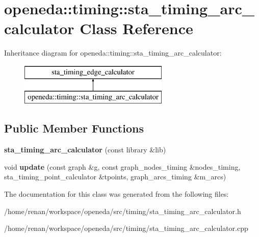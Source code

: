 \hypertarget{classopeneda_1_1timing_1_1sta__timing__arc__calculator}{\section{openeda\-:\-:timing\-:\-:sta\-\_\-timing\-\_\-arc\-\_\-calculator Class Reference}
\label{classopeneda_1_1timing_1_1sta__timing__arc__calculator}
}
Inheritance diagram for openeda\-:\-:timing\-:\-:sta\-\_\-timing\-\_\-arc\-\_\-calculator\-:\begin{figure}[H]
\begin{center}
\leavevmode
\includegraphics[height=2.000000cm]{classopeneda_1_1timing_1_1sta__timing__arc__calculator}
\end{center}
\end{figure}
\subsection*{Public Member Functions}
\begin{DoxyCompactItemize}
\item 
\hypertarget{classopeneda_1_1timing_1_1sta__timing__arc__calculator_a478550315b8d1971a99b67e966619e0b}{{\bfseries sta\-\_\-timing\-\_\-arc\-\_\-calculator} (const library \&lib)}\label{classopeneda_1_1timing_1_1sta__timing__arc__calculator_a478550315b8d1971a99b67e966619e0b}

\item 
\hypertarget{classopeneda_1_1timing_1_1sta__timing__arc__calculator_acd5f6f3ff6936ec48aee3a61d12312cf}{void {\bfseries update} (const graph \&g, const graph\-\_\-nodes\-\_\-timing \&nodes\-\_\-timing, sta\-\_\-timing\-\_\-point\-\_\-calculator \&tpoints, graph\-\_\-arcs\-\_\-timing \&m\-\_\-arcs)}\label{classopeneda_1_1timing_1_1sta__timing__arc__calculator_acd5f6f3ff6936ec48aee3a61d12312cf}

\end{DoxyCompactItemize}


The documentation for this class was generated from the following files\-:\begin{DoxyCompactItemize}
\item 
/home/renan/workspace/openeda/src/timing/sta\-\_\-timing\-\_\-arc\-\_\-calculator.\-h\item 
/home/renan/workspace/openeda/src/timing/sta\-\_\-timing\-\_\-arc\-\_\-calculator.\-cpp\end{DoxyCompactItemize}
